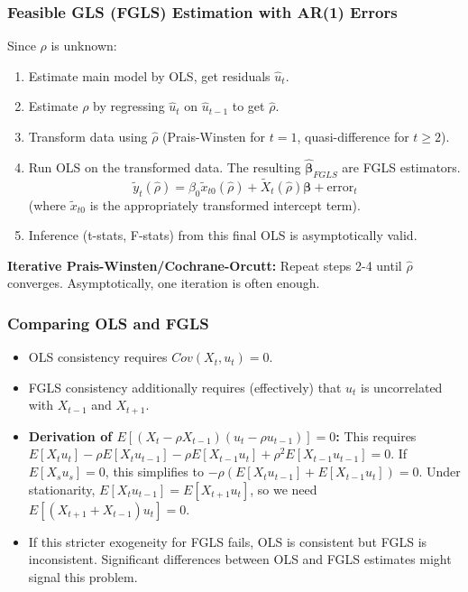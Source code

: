 \documentclass[a4paper, 10pt]{article}
\theoremstyle{definition}	%
\begin{document}
\subsubsection{Feasible GLS (FGLS) Estimation with AR(1) Errors}
Since \(\rho\) is unknown:
\begin{enumerate}
    \item Estimate main model by OLS, get residuals \(\hat{u}_t\).
    \item Estimate \(\rho\) by regressing \(\hat{u}_t\) on \(\hat{u}_{t-1}\) to get \(\hat{\rho}\).
    \item Transform data using \(\hat{\rho}\) (Prais-Winsten for \(t=1\), quasi-difference for \(t \ge 2\)).
    \item Run OLS on the transformed data. The resulting \(\hat{\boldsymbol{\beta}}_{FGLS}\) are FGLS estimators.
    \begin{equation} \label{eq:fgls_transformed_eq}
    \tilde{y}_t(\hat{\rho}) = \beta_0 \tilde{x}_{t0}(\hat{\rho}) + \tilde{X}_t(\hat{\rho})\boldsymbol{\beta} + \text{error}_t
    \end{equation}
    (where \(\tilde{x}_{t0}\) is the appropriately transformed intercept term).
    \item Inference (t-stats, F-stats) from this final OLS is asymptotically valid.
\end{enumerate}
\textbf{Iterative Prais-Winsten/Cochrane-Orcutt:} Repeat steps 2-4 until \(\hat{\rho}\) converges. Asymptotically, one iteration is often enough.

\subsubsection{Comparing OLS and FGLS}
\begin{itemize}
    \item OLS consistency requires \(Cov(X_t, u_t)=0\).
    \item FGLS consistency additionally requires (effectively) that \(u_t\) is uncorrelated with \(X_{t-1}\) and \(X_{t+1}\).
    \item \textbf{Derivation of \(E[(X_t - \rho X_{t-1})(u_t - \rho u_{t-1})] = 0\):}
    This requires \(E[X_t u_t] - \rho E[X_t u_{t-1}] - \rho E[X_{t-1} u_t] + \rho^2 E[X_{t-1} u_{t-1}] = 0\).
    If \(E[X_s u_s]=0\), this simplifies to \(-\rho (E[X_t u_{t-1}] + E[X_{t-1} u_t]) = 0\).
    Under stationarity, \(E[X_t u_{t-1}] = E[X_{t+1} u_t]\), so we need \(E[(X_{t+1} + X_{t-1})u_t] = 0\).
    \item If this stricter exogeneity for FGLS fails, OLS is consistent but FGLS is inconsistent. Significant differences between OLS and FGLS estimates might signal this problem.
\end{itemize}
\end{document}
